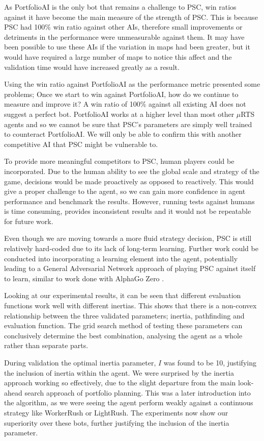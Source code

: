 \documentclass[]{article}
\begin{document}
As PortfolioAI is the only bot that remains a challenge to PSC, win ratios against it have become the main measure of the strength of PSC. This is because PSC had 100\% win ratio against other AIs, therefore small improvements or detriments in the performance were unmeasurable against them. It may have been possible to use these AIs if the variation in maps had been greater, but it would have required a large number of maps to notice this affect and the validation time would have increased greatly as a result.

Using the win ratio against PortfolioAI as the performance metric presented some problems; Once we start to win against PortfolioAI, how do we continue to measure and improve it? A win ratio of 100\% against all existing AI does not suggest a perfect bot. PortfolioAI works at a higher level than most other $\mu$RTS agents and so we cannot be sure that PSC’s parameters are simply well trained to counteract PortfolioAI. We will only be able to confirm this with another competitive AI that PSC might be vulnerable to. 

To provide more meaningful competitors to PSC, human players could be incorporated. Due to the human ability to see the global scale and strategy of the game, decisions would be made proactively as opposed to reactively. This would give a proper challenge to the agent, so we can gain more confidence in agent performance and benchmark the results. However, running tests against humans is time consuming, provides inconsistent results and it would not be repeatable for future work.

Even though we are moving towards a more fluid strategy decision, PSC is still relatively hard-coded due to its lack of long-term learning. Further work could be conducted into incorporating a learning element into the agent, potentially leading to a General Adversarial Network approach of playing PSC against itself to learn, similar to work done with AlphaGo Zero \cite{silver2017mastering}. 

Looking at our experimental results, it can be seen that different evaluation functions work well with different inertias. This shows that there is a non-convex relationship between the three validated parameters; inertia, pathfinding and evaluation function. The grid search method of testing these parameters can conclusively determine the best combination, analysing the agent as a whole rather than separate parts.

During validation the optimal inertia parameter, $I$ was found to be 10, justifying the inclusion of inertia within the agent. We were surprised by the inertia approach working so effectively, due to the slight departure from the main look-ahead search approach of portfolio planning. This was a later introduction into the algorithm, as we were seeing the agent perform weakly against a continuous strategy like WorkerRush or LightRush. The experiments now show our superiority over these bots, further justifying the inclusion of the inertia parameter. 
\end{document}
